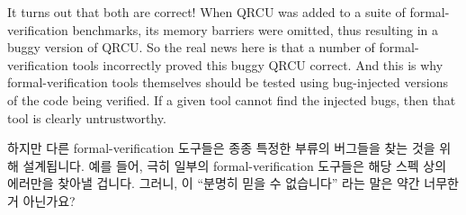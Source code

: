 It turns out that both are correct!
When QRCU was added to a suite of formal-verification benchmarks,
its memory barriers were omitted, thus resulting in a buggy version
of QRCU.
So the real news here is that a number of formal-verification tools
incorrectly proved this buggy QRCU correct.
And this is why formal-verification tools themselves should be tested
using bug-injected versions of the code being verified.
If a given tool cannot find the injected bugs, then that tool is
clearly untrustworthy.
\fi

\QuickQuiz{}
	하지만 다른 formal-verification 도구들은 종종 특정한 부류의 버그들을
	찾는 것을 위해 설계됩니다.
	예를 들어, 극히 일부의 formal-verification 도구들은 해당 스펙 상의
	에러만을 찾아낼 겁니다.
	그러니, 이 ``분명히 믿을 수 없습니다'' 라는 말은 약간 너무한 거
	아닌가요?
	\iffalse

